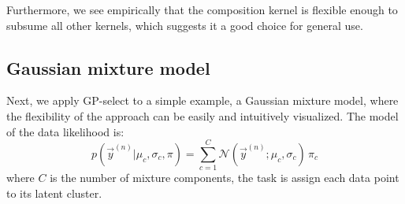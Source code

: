 
Furthermore, we see empirically that the composition kernel is flexible enough to subsume all other kernels, which suggests it a good choice  for general use. 


\subsection{Gaussian mixture model}
%
Next, we apply GP-select to a simple example, a Gaussian mixture model, where the flexibility of the approach can be easily and intuitively visualized.
The model of the data likelihood is:
%
\vspace{-.2cm}
\begin{equation}\label{eq:mog}
p(\vec{y}^{(n)} | \mu_c, \sigma_c, \pi) = \sum_{c=1}^{C} \mathcal{N}(\vec{y}^{(n)}; \mu_c, \sigma_c) \, \pi_c
\end{equation}
%
where $C$ is the number of mixture components, the task is assign each data point to its latent cluster.
%

